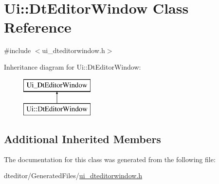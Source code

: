 \hypertarget{class_ui_1_1_dt_editor_window}{}\section{Ui\+::Dt\+Editor\+Window Class Reference}
\label{class_ui_1_1_dt_editor_window}


{\ttfamily \#include $<$ui\+\_\+dteditorwindow.\+h$>$}

Inheritance diagram for Ui\+::Dt\+Editor\+Window\+:\begin{figure}[H]
\begin{center}
\leavevmode
\includegraphics[height=2.000000cm]{dd/d43/class_ui_1_1_dt_editor_window}
\end{center}
\end{figure}
\subsection*{Additional Inherited Members}


The documentation for this class was generated from the following file\+:\begin{DoxyCompactItemize}
\item 
dteditor/\+Generated\+Files/\mbox{\hyperlink{ui__dteditorwindow_8h}{ui\+\_\+dteditorwindow.\+h}}\end{DoxyCompactItemize}
